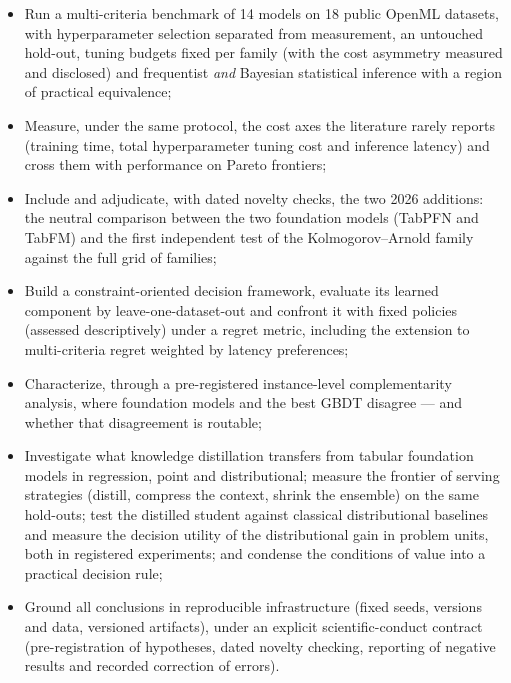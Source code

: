 \begin{itemize}
  \item Run a multi-criteria benchmark of 14 models on 18 public
    OpenML datasets, with hyperparameter selection separated from
    measurement, an untouched hold-out, tuning budgets fixed per
    family (with the cost asymmetry measured and disclosed) and
    frequentist \emph{and} Bayesian statistical inference with a
    region of practical equivalence;
  \item Measure, under the same protocol, the cost axes the
    literature rarely reports (training time, total hyperparameter
    tuning cost and inference latency) and cross them with
    performance on Pareto frontiers;
  \item Include and adjudicate, with dated novelty checks, the two
    2026 additions: the neutral comparison between the two foundation
    models (TabPFN and TabFM) and the first independent test of the
    Kolmogorov--Arnold family against the full grid of families;
  \item Build a constraint-oriented decision framework, evaluate
    its learned component by leave-one-dataset-out and confront it
    with fixed policies (assessed descriptively) under a regret
    metric, including the
    extension to multi-criteria regret weighted by latency
    preferences;
  \item Characterize, through a pre-registered instance-level
    complementarity analysis, where foundation models and the best
    GBDT disagree --- and whether that disagreement is routable;
  \item Investigate what knowledge distillation transfers from
    tabular foundation models in regression, point and
    distributional; measure the frontier of serving strategies
    (distill, compress the context, shrink the ensemble) on the same
    hold-outs; test the distilled student against classical
    distributional baselines and measure the decision utility of the
    distributional gain in problem units, both in registered
    experiments; and condense the conditions of value into a
    practical decision rule;
  \item Ground all conclusions in reproducible infrastructure (fixed
    seeds, versions and data, versioned artifacts), under an explicit
    scientific-conduct contract (pre-registration of hypotheses,
    dated novelty checking, reporting of negative results and
    recorded correction of errors).
\end{itemize}

